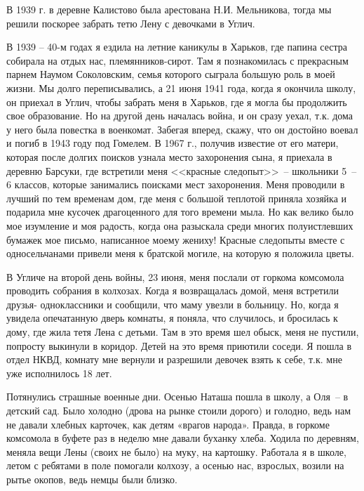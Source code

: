В  1939 г. в деревне  Калистово  была  арестована  Н.И. Мельникова,  тогда  мы 
решили  поскорее забрать тетю Лену с девочками  в Углич.

В  1939 -- 40-м годах  я  ездила на летние каникулы  в  Харьков, где папина сестра 
собирала  на  отдых  нас, племянников-сирот.  Там  я  познакомилась  с  прекрасным 
парнем Наумом Соколовским, семья  которого сыграла большую роль  в моей  жизни. 
Мы  долго переписывались, а 21  июня 1941  года, когда я окончила школу, он приехал 
в Углич, чтобы забрать меня в Харьков, где я могла бы продолжить свое образование. 
Но на другой день началась война, и он сразу уехал, т.к. дома у него  была повестка в 
военкомат. Забегая вперед, скажу, что  он достойно воевал  и погиб  в  1943 году  под 
Гомелем. В  1967 г., получив  известие от  его матери, которая  после долгих поисков 
узнала место захоронения сына, я приехала в деревню  Барсуки, где  встретили меня <<красные следопыт>>~-- школьники 5~-- 6 классов, которые занимались поисками мест 
захоронения. Меня проводили в лучший по тем временам дом,  где  меня  с  большой 
теплотой приняла хозяйка  и подарила  мне кусочек драгоценного  для того  времени 
мыла. Но как велико было мое изумление  и моя радость, когда она  разыскала  среди 
многих  полуистлевших бумажек мое письмо, написанное  моему  жениху!  Красные 
следопыты  вместе с односельчанами  привели меня к братской  могиле, на  которую 
я  положила цветы.

В Угличе на второй  день войны, 23 июня, меня послали  от  горкома комсомола 
проводить собрания в колхозах. Когда я возвращалась домой, меня встретили друзья- одноклассники  и  сообщили, что  маму  увезли  в  больницу.  Но, когда  я  увидела 
опечатанную дверь комнаты, я поняла, что случилось, и бросилась  к дому, где  жила 
тетя  Лена  с  детьми. Там  в это  время  шел  обыск,  меня  не  пустили,  попросту 
выкинули в коридор. Детей на это время  приютили  соседи. Я пошла в отдел НКВД, 
комнату мне вернули и разрешили девочек  взять к себе, т.к. мне уже исполнилось 18 
лет.

Потянулись  страшные  военные  дни. Осенью Наташа пошла  в школу, а Оля~-- в 
детский  сад. Было холодно (дрова на рынке  стоили дорого) и голодно,  ведь нам  не 
давали хлебных карточек, как детям «врагов народа». Правда, в  горкоме  комсомола 
в буфете раз  в неделю мне давали буханку хлеба. Ходила по деревням, меняла вещи 
Лены (своих не было) на муку,  на картошку. Работала я в школе,  летом  с  ребятами 
в  поле помогали колхозу, а осенью нас, взрослых,  возили  на  рытье  окопов,  ведь 
немцы  были близко.

